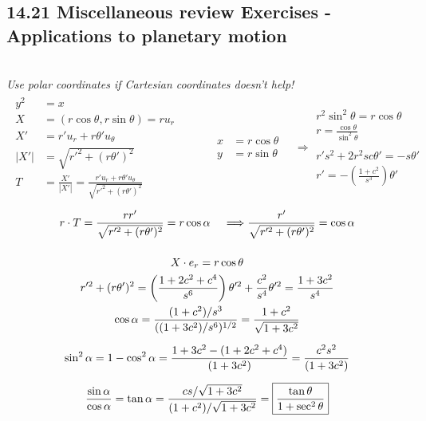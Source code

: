 \documentclass[twoside]{amsart}
\theoremstyle{plain}
\theoremstyle{definition}
\newcommand{\exercisehead}[1]
  {\smallskip
   \noindent{\small\bf Exercise #1.}}
\begin{document}
\subsection*{ 14.21 Miscellaneous review Exercises - Applications to planetary motion }
\quad \\
\exercisehead{1} \emph{ Use polar coordinates if Cartesian coordinates doesn't help! } 
\[
\begin{gathered}
  \begin{aligned}
    y^2 & = x \\
    X & = (r\cos{\theta},r\sin{\theta}) = ru_r \\
    X' & = r'u_r + r\theta' u_{\theta} \\
    |X'| & = \sqrt{ r'^2 + (r\theta')^2 } \\
    T & =\frac{X'}{|X'|} = \frac{ r'u_r + r\theta' u_{\theta}}{ \sqrt{ r'^2 + (r\theta')^2 } }
  \end{aligned} \quad \quad  \quad 
\begin{aligned}
  x & = r\cos{\theta} \\
  y & = r\sin{\theta} 
\end{aligned} \quad \Longrightarrow \begin{gathered}
  r^2 \sin^2{\theta} = r \cos{\theta} \\
  r = \frac{\cos{\theta}}{ \sin^2{\theta}} \\
  \quad \\
  r' s^2 + 2r^2 sc \theta' = -s \theta' \\
  r' = - \left( \frac{ 1 + c^2 }{ s^3 } \right) \theta'
\end{gathered} 
\end{gathered}
\]
\[
\begin{gathered}
  r\cdot T = \frac{ rr' }{ \sqrt{ r'^2 + (r\theta')^2 } } = r\cos{\alpha } \quad \, \Longrightarrow \frac{ r' }{ \sqrt{ r'^2 + (r\theta')^2 } } = \cos{\alpha} \bigskip \\
  X \cdot e_r = r\cos{\theta}  \\
  \begin{gathered}
    r'^2 + (r\theta')^2 = \left( \frac{ 1 + 2c^2 + c^4}{ s^6 } \right) \theta'^2 + \frac{ c^2}{s^4} \theta'^2 = \frac{1 + 3c^2}{s^4} \\
    \cos{\alpha} = \frac{ (1+c^2)/s^3}{ ((1+3c^2)/s^6)^{1/2} } = \frac{ 1 +c^2 }{ \sqrt{ 1 + 3c^2 } } \medskip \\
    \sin^2{\alpha} = 1 - \cos^2{\alpha} = \frac{ 1 + 3c^2 - (1+2c^2 + c^4) }{ (1+3c^2) } = \frac{ c^2 s^2 }{ (1+3c^2) } \medskip 
  \end{gathered} \\
  \frac{ \sin{\alpha}}{\cos{\alpha}} = \tan{\alpha} = \frac{ cs/\sqrt{ 1 + 3c^2} }{ (1+c^2)/ \sqrt{ 1 + 3c^2 } } = \boxed{ \frac{ \tan{\theta}}{ 1+\sec^2{\theta} } }
\end{gathered}
\]
\end{document}

